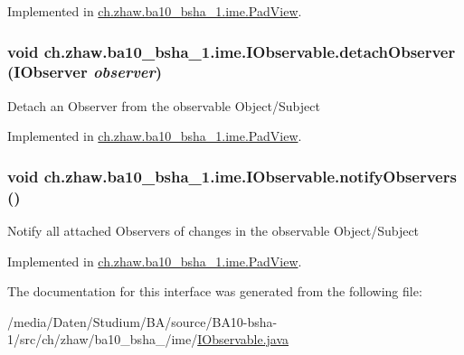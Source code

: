 Implemented in \hyperlink{classch_1_1zhaw_1_1ba10__bsha__1_1_1ime_1_1PadView_a4969dbd30351775211919860ef1f8643}{ch.zhaw.ba10\_\-bsha\_\-1.ime.PadView}.\hypertarget{interfacech_1_1zhaw_1_1ba10__bsha__1_1_1ime_1_1IObservable_a18a068196edc176c68282162bab22eff}{
\subsubsection[{detachObserver}]{\setlength{\rightskip}{0pt plus 5cm}void ch.zhaw.ba10\_\-bsha\_\-1.ime.IObservable.detachObserver ({\bf IObserver} {\em observer})}}
\label{interfacech_1_1zhaw_1_1ba10__bsha__1_1_1ime_1_1IObservable_a18a068196edc176c68282162bab22eff}
Detach an Observer from the observable Object/Subject 

Implemented in \hyperlink{classch_1_1zhaw_1_1ba10__bsha__1_1_1ime_1_1PadView_a1a924fadb8d0d1e9278a1ad136bcfb13}{ch.zhaw.ba10\_\-bsha\_\-1.ime.PadView}.\hypertarget{interfacech_1_1zhaw_1_1ba10__bsha__1_1_1ime_1_1IObservable_ade6befac243ff61d162ba09d6ff2e31d}{
\subsubsection[{notifyObservers}]{\setlength{\rightskip}{0pt plus 5cm}void ch.zhaw.ba10\_\-bsha\_\-1.ime.IObservable.notifyObservers ()}}
\label{interfacech_1_1zhaw_1_1ba10__bsha__1_1_1ime_1_1IObservable_ade6befac243ff61d162ba09d6ff2e31d}
Notify all attached Observers of changes in the observable Object/Subject 

Implemented in \hyperlink{classch_1_1zhaw_1_1ba10__bsha__1_1_1ime_1_1PadView_a1516c15d8011caccf368c5d709f19e01}{ch.zhaw.ba10\_\-bsha\_\-1.ime.PadView}.

The documentation for this interface was generated from the following file:\begin{DoxyCompactItemize}
\item 
/media/Daten/Studium/BA/source/BA10-\/bsha-\/1/src/ch/zhaw/ba10\_\-bsha\_/ime/\hyperlink{IObservable_8java}{IObservable.java}\end{DoxyCompactItemize}
